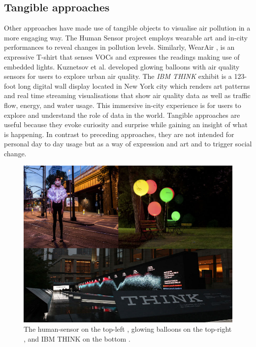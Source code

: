 \subsection{Tangible approaches}
Other approaches have made use of tangible objects to visualise air pollution in a more engaging way. The Human Sensor project \cite{InvisibleDust2016} employs wearable art and in-city performances to reveal changes in pollution levels. Similarly, WearAir \cite{Kim2010},  is an expressive T-shirt that senses VOCs and expresses the readings making use of embedded lights. Kuznetsov et al. \cite{Kuznetsov2011} developed glowing balloons with air quality sensors for users to explore urban air quality. The \textit{IBM THINK} exhibit \cite{IBM2012} is a 123-foot long digital wall display located in New York city which renders art patterns and real time streaming visualisations  that show air quality data as well as traffic flow, energy, and water usage. This immersive in-city experience is for users to explore and understand the role of data in the world. Tangible approaches are useful because they evoke curiosity and surprise while gaining an insight of what is happening. In contrast to preceding approaches, they are not intended for personal day to day usage but as a way of expression and art and to trigger social change. 

\begin{figure}[H]
\begin{adjustbox}{width=.8\textwidth,center=\textwidth}
  \centering
  \includegraphics[scale=.4]{images/think_human_sensor_balloons.jpg}
\end{adjustbox}
  \caption[Tangible visualisations]{The human-sensor on the top-left \cite{InvisibleDust2016}, glowing balloons on the top-right \cite{Kuznetsov2011}, and IBM THINK on the bottom \cite{IBM2012}.}
  \label{fig:photo_based_instaNO2}
\end{figure}

